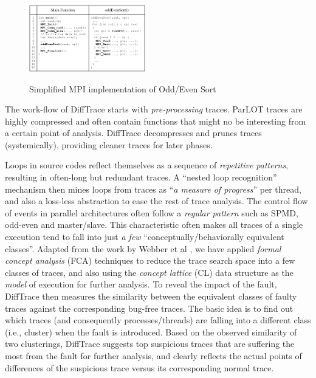 \begin{figure}[]
\centering
\caption{Simplified MPI implementation of Odd/Even Sort}
\includegraphics[width=0.45\textwidth]{figs/oddEven.png}
\label{fig.oddEven}
\end{figure}

The work-flow of DiffTrace starts with \textit{pre-processing} traces. ParLOT traces are highly compressed and often contain functions that might no be interesting from a certain point of analysis. DiffTrace decompresses and prunes traces (systemically), providing cleaner traces for later phases.  
%

Loops in source codes reflect themselves as a sequence of \textit{repetitive patterns}, resulting in often-long but redundant traces. A ``nested loop  recognition'' mechanism then mines loops from traces as ``\textit{a measure of progress}'' per thread, and also a loss-less abstraction to ease the rest of trace analysis.
%
The control flow of events in parallel architectures often follow a \textit{regular pattern} such as SPMD, odd-even and master/slave. This characteristic often makes all traces of a single execution tend to fall into just \textit{a few} ``conceptually/behaviorally equivalent classes''. Adapted from the work by Webber et al \cite{weberStructural}, we have applied \textit{formal concept analysis} (FCA)\cite{clbook} techniques to reduce the trace search space into a few classes of traces, and also using the \textit{concept lattice} (CL) data structure as the \textit{model} of execution for further analysis.
%
To reveal the impact of the fault, DiffTrace then measures the similarity between the equivalent classes of faulty traces against the corresponding bug-free traces.
%
The basic idea is to find out which traces (and consequently processes/threads) are falling into a different class (i.e., cluster) when the fault is introduced.
%
Based on the observed similarity of two clusterings, DiffTrace suggests top suspicious traces that are suffering the most from the fault for further analysis, and clearly reflects the actual points of differences of the suspicious trace versus its corresponding normal trace.
%

